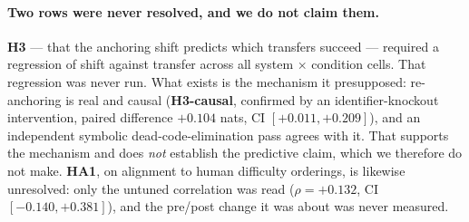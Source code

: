 \paragraph{Two rows were never resolved, and we do not claim them.}
\textbf{H3} --- that the anchoring shift predicts which transfers succeed --- required a regression
of shift against transfer across all system $\times$ condition cells. That regression was never
run. What exists is the mechanism it presupposed: re-anchoring is real and causal
(\textbf{H3-causal}, confirmed by an identifier-knockout intervention, paired difference $+0.104$
nats, CI $[+0.011, +0.209]$), and an independent symbolic dead-code-elimination pass agrees with
it. That supports the mechanism and does \emph{not} establish the predictive claim, which we
therefore do not make. \textbf{HA1}, on alignment to human difficulty orderings, is likewise
unresolved: only the untuned correlation was read ($\rho = +0.132$, CI $[-0.140, +0.381]$), and the
pre/post change it was about was never measured.

